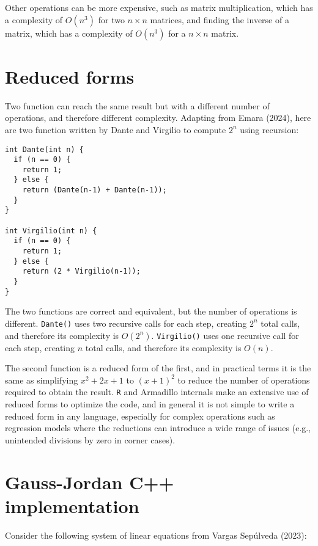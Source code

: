 Other operations can be more expensive, such as matrix multiplication, which has
a complexity of \(O(n^3)\) for two \(n \times n\) matrices, and finding the inverse
of a matrix, which has a complexity of \(O(n^3)\) for a \(n \times n\) matrix.

\hypertarget{reduced-forms}{%
\section{Reduced forms}\label{reduced-forms}}

Two function can reach the same result but with a different number of
operations, and therefore different complexity. Adapting from Emara (2024),
here are two function written by Dante and Virgilio to compute \(2^n\) using
recursion:

\begin{verbatim}
int Dante(int n) {
  if (n == 0) {
    return 1;
  } else {
    return (Dante(n-1) + Dante(n-1));
  }
}

int Virgilio(int n) {
  if (n == 0) {
    return 1;
  } else {
    return (2 * Virgilio(n-1));
  }
}
\end{verbatim}

The two functions are correct and equivalent, but the number of operations is
different. \texttt{Dante()} uses two recursive calls for each step, creating \(2^n\)
total calls, and therefore its complexity is \(O(2^n)\). \texttt{Virgilio()} uses one
recursive call for each step, creating \(n\) total calls, and therefore its
complexity is \(O(n)\).

The second function is a reduced form of the first, and in practical terms it is
the same as simplifying \(x^2 + 2x + 1\) to \((x+1)^2\) to reduce the number of
operations required to obtain the result. \texttt{R} and Armadillo internals make an
extensive use of reduced forms to optimize the code, and in general it is not
simple to write a reduced form in any language, especially for complex
operations such as regression models where the reductions can introduce a wide
range of issues (e.g., unintended divisions by zero in corner cases).

\hypertarget{gauss-jordan-c-implementation}{%
\section{Gauss-Jordan C++ implementation}\label{gauss-jordan-c-implementation}}

Consider the following system of linear equations from Vargas Sepúlveda (2023):

